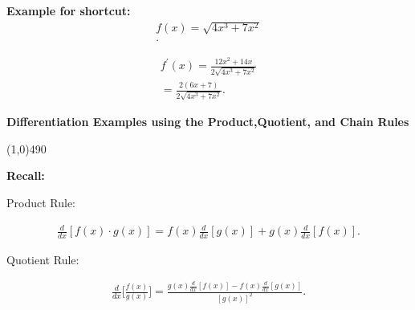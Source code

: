 \documentclass{report}
\begin{document}
  \bigbreak \noindent 
  \begin{mdframed}
    \textbf{Example for shortcut:}
    \begin{align*}
      f(x) = \sqrt{4x^{3}+7x^{2}} \\ 
    .\end{align*}
  \end{mdframed}
  \begin{align*}
    f^{\prime}(x) = \frac{12x^{2}+14x}{2\sqrt{4x^{3}+7x^{2}}} \\
    = \frac{2(6x+7)}{2\sqrt{4x^{3}+7x^{2}}}
  .\end{align*}
  
  \pagebreak \bigbreak \noindent
  \begin{mdframed}
  \begin{large}
      \begin{center}
          \textbf{Differentiation Examples using the Product,Quotient, and Chain Rules}
      \end{center}
  \end{large}
  \end{mdframed}
  \line(1,0){490}

  \bigbreak \noindent \bigbreak
  \begin{mdframed}
    \textbf{Recall:}
    \bigbreak \noindent 
    \begin{center}
      Product Rule:
    \end{center}
    \begin{align*}
      \frac{d}{dx}[f(x) \cdot g(x)] = f(x) \frac{d}{dx}[g(x)] + g(x) \frac{d}{dx}[f(x)]
    .\end{align*}
    \bigbreak \noindent 
    \begin{center}
      Quotient Rule:
    \end{center}
    \begin{align*}
      \frac{d}{dx}\bigg[ \frac{f(x)}{g(x)}\bigg] = \frac{g(x) \frac{d}{dx}[f(x)] - f(x) \frac{d}{dx}[g(x)]}{[g(x)]^2}
    .\end{align*}
  \end{mdframed}
  
\end{document}
